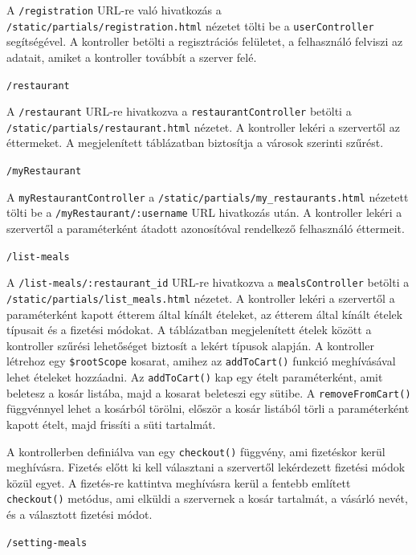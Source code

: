 A \texttt{/registration} URL-re való hivatkozás a \texttt{/static/partials/registration.html} nézetet tölti be a \texttt{userController} segítségével. A kontroller betölti a regisztrációs felületet, a felhasználó felviszi az adatait, amiket a kontroller továbbít a szerver felé.

\bigskip

\noindent \texttt{/restaurant}

A \texttt{/restaurant} URL-re hivatkozva a \texttt{restaurantController} betölti a \texttt{/static/partials/restaurant.html} nézetet. A kontroller lekéri a szervertől az éttermeket. A megjelenített táblázatban biztosítja a városok szerinti szűrést.

\bigskip

\noindent \texttt{/myRestaurant}

A \texttt{myRestaurantController} a \texttt{/static/partials/my\_restaurants.html} nézetett tölti be a \texttt{/myRestaurant/:username} URL hivatkozás után. A kontroller lekéri a szervertől a paraméterként átadott azonosítóval rendelkező felhasználó éttermeit.

\bigskip

\noindent \texttt{/list-meals}

A \texttt{/list-meals/:restaurant\_id} URL-re hivatkozva a \texttt{mealsController} betölti a \texttt{/static/partials/list\_meals.html} nézetet. A kontroller lekéri a szervertől a paraméterként kapott étterem által kínált ételeket, az étterem által kínált ételek típusait és a fizetési módokat. A táblázatban megjelenített ételek között a kontroller szűrési lehetőséget biztosít a lekért típusok alapján. A kontroller létrehoz egy \texttt{\$rootScope} kosarat, amihez az \texttt{addToCart()} funkció meghívásával lehet ételeket hozzáadni. Az \texttt{addToCart()} kap egy ételt paraméterként, amit beletesz a kosár listába, majd a kosarat beleteszi egy sütibe. A \texttt{removeFromCart()} függvénnyel lehet a kosárból törölni, először a kosár listából törli a paraméterként kapott ételt, majd frissíti a süti tartalmát.

A kontrollerben definiálva van egy \texttt{checkout()} függvény, ami fizetéskor kerül meghívásra. Fizetés előtt ki kell választani a szervertől lekérdezett fizetési módok közül egyet. A fizetés-re kattintva meghívásra kerül a fentebb említett \texttt{checkout()} metódus, ami elküldi a szervernek a kosár tartalmát, a vásárló nevét, és a választott fizetési módot.

\bigskip

\noindent \texttt{/setting-meals}

